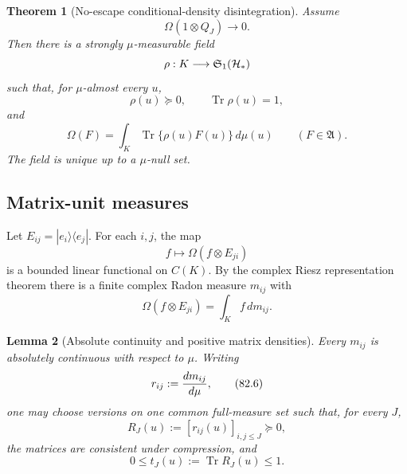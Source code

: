 \documentclass[11pt]{article}
\newtheorem{theorem}{Theorem}[section]
\newtheorem{lemma}[theorem]{Lemma}
\theoremstyle{remark}
\begin{document}
\begin{theorem}[No-escape conditional-density disintegration]
\label{thm:v12v82-disintegration}
Assume
\begin{equation}
                         \Omega(1\otimes Q_J)\longrightarrow0.
                                                                    \tag{82.2}
\end{equation}
Then there is a strongly \(\mu\)-measurable field
\[
 \rho:K\longrightarrow{\mathfrak S}_1({\cal H}_*)
\]
such that, for \(\mu\)-almost every \(u\),
\begin{equation}
                         \rho(u)\succeq0,\qquad
                         \operatorname{Tr}\rho(u)=1,         \tag{82.3}
\end{equation}
and
\begin{equation}
 \boxed{\displaystyle
 \Omega(F)=\int_K
 \operatorname{Tr}\{\rho(u)F(u)\}\,d\mu(u)}
 \qquad(F\in{\mathfrak A}).                                 \tag{82.4}
\end{equation}
The field is unique up to a \(\mu\)-null set.
\end{theorem}

\subsection{Matrix-unit measures}

Let \(E_{ij}=|e_i\rangle\langle e_j|\).  For each \(i,j\), the map
\[
 f\longmapsto\Omega(f\otimes E_{ji})
\]
is a bounded linear functional on \(C(K)\).  By the complex Riesz
representation theorem there is a finite complex Radon measure
\(m_{ij}\) with
\begin{equation}
                         \Omega(f\otimes E_{ji})
                         =\int_Kf\,dm_{ij}.                  \tag{82.5}
\end{equation}

\begin{lemma}[Absolute continuity and positive matrix densities]
\label{lem:v12v82-matrix-density}
Every \(m_{ij}\) is absolutely continuous with respect to \(\mu\).
Writing
\[
                         r_{ij}:={dm_{ij}\over d\mu},         \tag{82.6}
\]
one may choose versions on one common full-measure set such that,
for every \(J\),
\begin{equation}
                         R_J(u):=[r_{ij}(u)]_{i,j\leq J}
                         \succeq0,                           \tag{82.7}
\end{equation}
the matrices are consistent under compression, and
\begin{equation}
                  0\leq t_J(u):=\operatorname{Tr}R_J(u)
                  \leq1.                                    \tag{82.8}
\end{equation}
\end{lemma}
\end{document}
